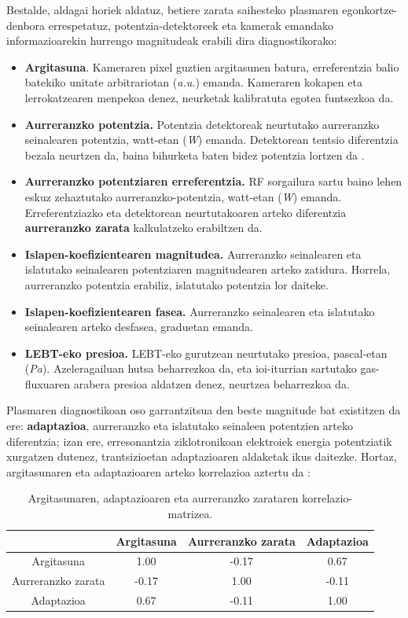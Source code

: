 \documentclass[12pt]{article}
\numberwithin{figure}{section}
\numberwithin{equation}{section}
\begin{document}
Bestalde, aldagai horiek aldatuz, betiere zarata saihesteko plasmaren egonkortze-denbora errespetatuz, potentzia-detektoreek eta kamerak emandako informazioarekin hurrengo magnitudeak erabili dira diagnostikorako:

\begin{itemize}
    \item \textbf{Argitasuna}. Kameraren pixel guztien argitasunen batura, erreferentzia balio batekiko unitate arbitrariotan (\textit{a.u.}) emanda. Kameraren kokapen eta lerrokatzearen menpekoa denez, neurketak kalibratuta egotea funtsezkoa da. 
    \item \textbf{Aurreranzko potentzia.} Potentzia detektoreak neurtutako aurreranzko seinalearen potentzia, watt-etan (\textit{W}) emanda. Detektorean tentsio diferentzia bezala neurtzen da, baina bihurketa baten bidez potentzia lortzen da \cite{noauthor_schottky_2025}.
    \item \textbf{Aurreranzko potentziaren erreferentzia.} RF sorgailura sartu baino lehen eskuz zehaztutako aurreranzko-potentzia, watt-etan (\textit{W}) emanda. Erreferentziazko eta detektorean neurtutakoaren arteko diferentzia \textbf{aurreranzko zarata} kalkulatzeko erabiltzen da.
    \item \textbf{Islapen-koefizientearen magnitudea.} Aurreranzko seinalearen eta islatutako seinalearen potentziaren magnitudearen arteko zatidura. Horrela, aurreranzko potentzia erabiliz, islatutako potentzia lor daiteke.
    \item \textbf{Islapen-koefizientearen fasea.} Aurreranzko seinalearen eta islatutako seinalearen arteko desfasea, graduetan emanda.
    \item \textbf{LEBT-eko presioa.} LEBT-eko gurutzean neurtutako presioa, pascal-etan (\textit{Pa}). Azeleragailuan hutsa beharrezkoa da, eta ioi-iturrian sartutako gas-fluxuaren arabera presioa aldatzen denez, neurtzea beharrezkoa da.
\end{itemize}

Plasmaren diagnostikoan oso garrantzitsua den beste magnitude bat existitzen da ere: \textbf{adaptazioa}, aurreranzko eta islatutako seinaleen potentzien arteko diferentzia; izan ere, erresonantzia ziklotronikoan elektroiek energia potentziatik xurgatzen dutenez, trantsizioetan adaptazioaren aldaketak ikus daitezke. Hortaz, argitasunaren eta adaptazioaren arteko korrelazioa aztertu da \cite{fernandez_rua_clasificacion_2024}:

\begin{table}[h]
    \centering
    \begin{tabular}{c|c|c|c}
         & Argitasuna & Aurreranzko zarata & Adaptazioa \\
         \midrule
         Argitasuna & 1.00 & -0.17 & 0.67\\
         \midrule
         Aurreranzko zarata & -0.17 & 1.00 & -0.11 \\
         \midrule
         Adaptazioa & 0.67 & -0.11 & 1.00 \\
    \end{tabular}
    \caption{Argitasunaren, adaptazioaren eta aurreranzko zarataren korrelazio-matrizea.}
    \label{tab:korrelazioa}
\end{table}
\end{document}
